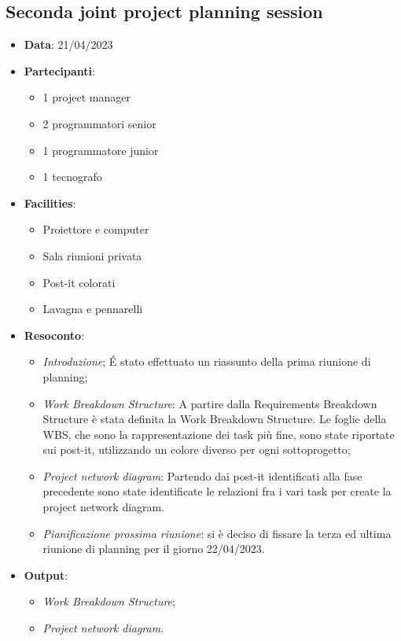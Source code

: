\documentclass{article}
\begin{document}
  \subsection{Seconda joint project planning session}
  \begin{itemize}
    \item \textbf{Data}: 21/04/2023
    \item \textbf{Partecipanti}:
    \begin{itemize}
      \item 1 project manager
      \item 2 programmatori senior
      \item 1 programmatore junior
      \item 1 tecnografo
    \end{itemize}
    \item \textbf{Facilities}:
    \begin{itemize}
      \item Proiettore e computer
      \item Sala riunioni privata
      \item Post-it colorati
      \item Lavagna e pennarelli
    \end{itemize}
    \item \textbf{Resoconto}:
    \begin{itemize}
      \item \emph{Introduzione};
        É stato effettuato un riassunto della prima riunione di planning;
      \item \emph{Work Breakdown Structure}:
        A partire dalla Requirements Breakdown Structure è stata definita la Work Breakdown Structure. 
        Le foglie della WBS, che sono la rappresentazione dei task più fine, sono state riportate sui post-it,
        utilizzando un colore diverso per ogni sottoprogetto;
      \item \emph{Project network diagram}:
        Partendo dai post-it identificati alla fase precedente sono state identificate le relazioni fra i 
        vari task per create la project network diagram.
      \item \emph{Pianificazione prossima riunione}: si è deciso di fissare la terza ed ultima riunione 
        di planning per il giorno 22/04/2023.
    \end{itemize}
    \item \textbf{Output}: 
    \begin{itemize}
      \item \emph{Work Breakdown Structure};
      \item \emph{Project network diagram}.
    \end{itemize}
  \end{itemize}
\end{document}
